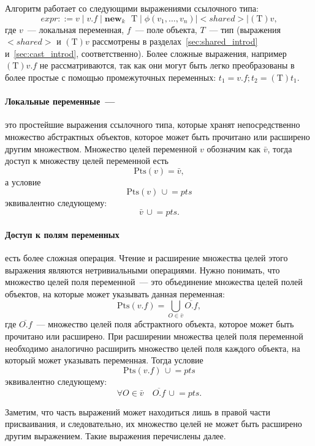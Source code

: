 \documentclass[14pt,titlepage]{extarticle}
\newcommand{\NEWi}[1]{\textbf{new}_{#1}\textbf{ }}
\newcommand{\Pts}[1]{\textrm{Pts}(#1)}
\newcommand{\VPts}[1]{\bar{#1}}
\newcommand{\OFPts}[2]{\overline{#1.#2}}
\newcommand{\cupe}{\,\cup\!\!=}
\let\oldphi\phi
\renewcommand{\phi}{\ensuremath{\oldphi}}
\begin{document}
        Алгоритм работает со следующими выражениями ссылочного типа:
        \[ expr ::= v \mid v.f \mid \NEWi{k} \textrm{T}
               \mid \phi(v_1, \ldots, v_n)
               \mid {<}shared{>} \mid (\textrm{T})v, \]
        где $v$~--- локальная переменная, $f$~--- поле объекта, $T$~--- тип
        (выражения ${<}shared{>}$ и $(\textrm{T})v$ рассмотрены в
        разделах~\ref{sec:shared_introd} и~\ref{sec:cast_introd},
        соответственно). Более сложные выражения, например $(\textrm{T})v.f$ не
        рассматриваются, так как они могут быть легко преобразованы в более
        простые с помощью промежуточных переменных: $t_1 = v.f; t_2 =
        (\textrm{T})t_1$.

        \paragraph{Локальные переменные~---} это простейшие выражения
        ссылочного типа, которые хранят непосредственно множество абстрактных
        объектов, которое может быть прочитано или расширено другим множеством.
        Множество целей переменной $v$ обозначим как $\VPts{v}$, тогда доступ к
        множеству целей переменной есть
        \[ \Pts{v} = \VPts{v}, \]
        а условие \[\Pts{v} \cupe pts\] эквивалентно следующему:
        \[ \VPts{v} \cupe pts. \]

        \paragraph{Доступ к полям переменных} есть более сложная операция.
        Чтение и расширение множества целей этого выражения являются
        нетривиальными операциями.
        Нужно понимать, что множество целей поля переменной~--- это объединение
        множества целей полей объектов, на которые может указывать данная
        переменная:
        \[\Pts{v.f} = \bigcup\limits_{O \in \VPts{v}} \OFPts{O}{f},\]
        где $\OFPts{O}{f}$~--- множество целей поля абстрактного объекта,
        которое может быть прочитано или расширено.
        При расширении множества целей поля переменной необходимо аналогично
        расширить множество целей поля каждого объекта, на который может
        указывать переменная. Тогда условие \[\Pts{v.f} \cupe pts\]
        эквивалентно следующему:
        \[ \forall O \in \VPts{v}\quad \OFPts{O}{f} \cupe pts. \]

        Заметим, что часть выражений может находиться лишь в правой части
        присваивания, и следовательно, их множество целей не может быть
        расширено другим выражением. Такие выражения перечислены далее.
\end{document}
